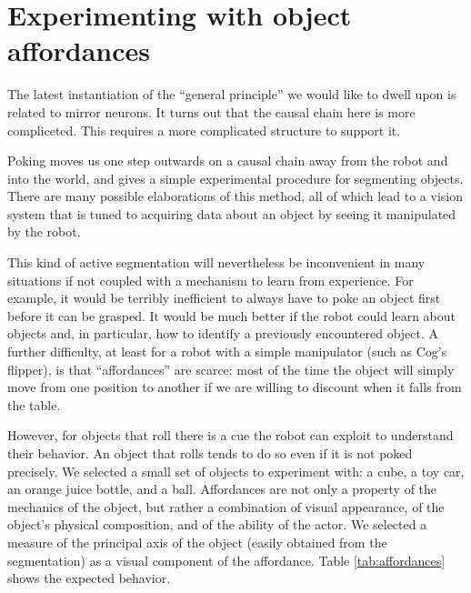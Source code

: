 
\section{Experimenting with object affordances}

\label{sect:experiment}

\ifverbose
The latest instantiation of the ``general principle'' we would like to
dwell upon is related to mirror neurons. It turns out that the causal
chain here is more compliceted. This requires a more complicated
structure to support it.
\fi

Poking moves us one step outwards on a causal chain away from the
robot and into the world, and gives a simple experimental procedure
for segmenting objects.  There are many possible elaborations of this
method, all of which lead to a vision system that is tuned to 
acquiring data about an object by seeing it manipulated by the robot.  

This kind of active segmentation will nevertheless be inconvenient in many situations if not 
coupled with a mechanism to learn from experience. For example, it 
would be terribly inefficient to always have to poke an object first
before it can be grasped.
It would be much better if the robot could learn about
objects and, in particular, how to identify a previously encountered object. 
A further difficulty, at least for a robot with a simple 
manipulator (such as Cog's flipper), is that ``affordances'' are scarce: 
most of the time the object will simply move from one position
to another if we are willing to discount when it falls from the table.

However, for objects that roll there is a cue the robot can exploit
to understand their behavior. An object that rolls tends to do so even 
if it is not poked precisely. We selected a small set of objects to
experiment with: a cube, a toy car, an orange juice bottle, and a ball.
Affordances are not only a property of the mechanics of the object, but 
rather a combination of visual appearance, of the object's physical 
composition, and of the ability of the actor. We selected a measure of
the principal axis of the object (easily obtained from the segmentation)
as a visual component of the affordance. Table \ref{tab:affordances} 
shows the expected behavior.

